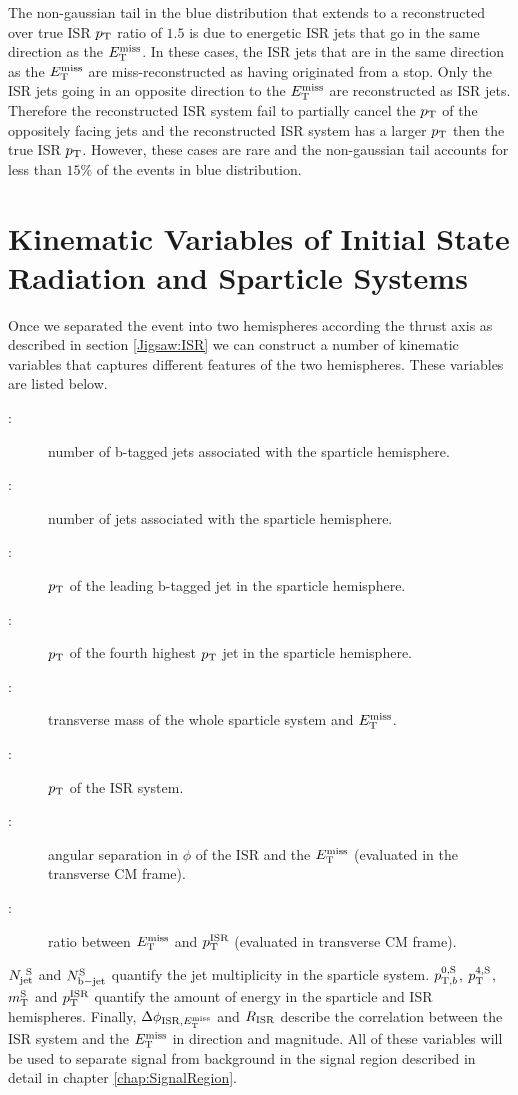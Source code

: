 \indent The non-gaussian tail in the blue distribution that extends to a reconstructed over true ISR $p_{\mathrm{T}}$ ratio of $1.5$ is due to energetic ISR jets that go in the same direction as the $E_{\mathrm{T}}^{\mathrm{miss}}$.  In these cases, the ISR jets that are in the same direction as the $E_{\mathrm{T}}^{\mathrm{miss}}$ are miss-reconstructed as having originated from a stop.  Only the ISR jets going in an opposite direction to the $E_{\mathrm{T}}^{\mathrm{miss}}$ are reconstructed as ISR jets.  Therefore the reconstructed ISR system fail to partially cancel the $p_{\mathrm{T}}$ of the oppositely facing jets and the reconstructed ISR system has a larger $p_{\mathrm{T}}$ then the true ISR $p_{\mathrm{T}}$.  However, these cases are rare and the non-gaussian tail accounts for less than $15$\% of the events in blue distribution. \\

\section{Kinematic Variables of Initial State Radiation and Sparticle Systems}
\label{Jigsaw:Variables}

\indent Once we separated the event into two hemispheres according the thrust axis as described in section \ref{Jigsaw:ISR} we can construct a number of kinematic variables that captures different features of the two hemispheres.  These variables are listed below. \\

\begin{description}
\item [\boldmath \NbV:] number of b-tagged jets associated with the sparticle hemisphere.
\item [\boldmath \NjV:] number of jets associated with the sparticle hemisphere.
\item [\boldmath \pTSBZero:] $p_{\mathrm{T}}$ of the leading b-tagged jet in the sparticle hemisphere.
\item [\boldmath \pTjV:] $p_{\mathrm{T}}$ of the fourth highest $p_{\mathrm{T}}$ jet in the sparticle hemisphere.
\item [\boldmath \MS:] transverse mass of the whole sparticle system and $E_{\mathrm{T}}^{\mathrm{miss}}$.
\item [\boldmath \PTISR:] $p_{\mathrm{T}}$ of the ISR system.
\item [\boldmath \dphiISRI:] angular separation in $\phi$ of the ISR and the $E_{\mathrm{T}}^{\mathrm{miss}}$ (evaluated in the transverse CM frame).
\item [\boldmath \RISR:] ratio between $E_{\mathrm{T}}^{\mathrm{miss}}$ and $p_{\mathrm{T}}^{\mathrm{ISR}}$ (evaluated in transverse CM frame).
\end{description}

\indent $N_{\mathrm{jet}}^{~\mathrm{S}}$ and $N_{\mathrm{b-jet}}^{\mathrm{S}}$ quantify the jet multiplicity in the sparticle system.  $p_{\mathrm{T},b}^{0,\mathrm{S}}$, $p_{\mathrm{T}}^{4,\mathrm{S}}$, $m_{\mathrm{T}}^{\mathrm{S}}$ and $p_{\mathrm{T}}^{\mathrm{ISR}}$ quantify the amount of energy in the sparticle and ISR hemispheres.  Finally, $\Delta\phi_{\mathrm{ISR},E_{\mathrm{T}}^{\mathrm{miss}}}$ and $R_{\mathrm{ISR}}$ describe the correlation between the ISR system and the $E_{\mathrm{T}}^{\mathrm{miss}}$ in direction and magnitude.  All of these variables will be used to separate signal from background in the signal region described in detail in chapter \ref{chap:SignalRegion}. \\

